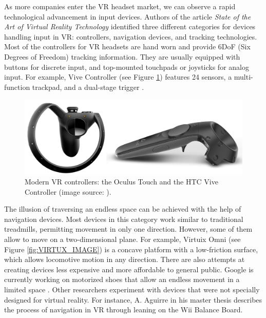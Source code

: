 As more companies enter the VR headset market, we can observe a rapid technological advancement in input devices. Authors of the article \textit{State of the Art of Virtual Reality Technology} \cite{VR_TECHNOLOGY} identified three different categories for devices handling input in VR: controllers, navigation devices, and tracking technologies. Most of the controllers for VR headsets are hand worn and provide 6DoF (Six Degrees of Freedom) tracking information. They are usually equipped with buttons for discrete input, and top-mounted touchpads or joysticks for analog input. For example, Vive Controller (see Figure \ref{fig:CONTROLLERS_IMAGE}) features 24 sensors, a multi-function trackpad, and a dual-stage trigger \cite{VIVE_IMAGE}.

\begin{figure}[th]
\centering
\includegraphics[width=1\textwidth]{img/modern_controllers.png}
\caption{Modern VR controllers: the Oculus Touch and the HTC Vive Controller (image source: \cite{VR_TECHNOLOGY}\cite{VIVE_IMAGE}).}
\label{fig:CONTROLLERS_IMAGE}
\end{figure}

The illusion of traversing an endless space can be achieved with the help of navigation devices. Most devices in this category work similar to traditional treadmills, permitting movement in only one direction. However, some of them allow to move on a two-dimensional plane. For example, Virtuix Omni (see Figure \ref{fig:VIRTUX_IMAGE}) is a concave platform with a low-friction surface, which allows locomotive motion in any direction. There are also attempts at creating devices less expensive and more affordable to general public. Google is currently working on motorized shoes that allow an endless movement in a limited space \cite{VR_SHOES}. Other researchers experiment with devices that were not specially designed for virtual reality. For instance, A. Aguirre in his master thesis \cite{JOYSTICK} describes the process of navigation in VR through leaning on the Wii Balance Board.

